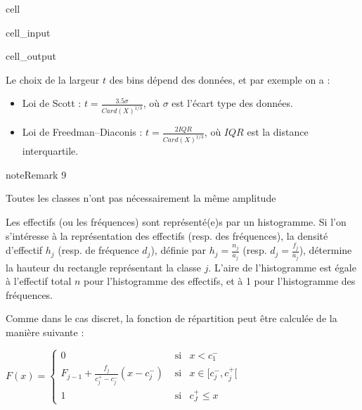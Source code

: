 \documentclass[letterpaper,10pt,english]{jupyterBook}
\begin{document}
\begin{sphinxuseclass}{cell}
\begin{sphinxVerbatimInput}
\begin{sphinxuseclass}{cell_input}
\end{sphinxuseclass}\end{sphinxVerbatimInput}
\begin{sphinxVerbatimOutput}

\begin{sphinxuseclass}{cell_output}
\noindent{}

\end{sphinxuseclass}\end{sphinxVerbatimOutput}

\end{sphinxuseclass}
\sphinxAtStartPar
Le choix de la largeur \(t\) des bins dépend des données, et par exemple on a :
\begin{itemize}
\item {} 
\sphinxAtStartPar
Loi de Scott : \(t = \frac{3.5 \sigma}{Card(X)^{1/3}}\), où \(\sigma\) est l’écart type des données.

\item {} 
\sphinxAtStartPar
Loi de Freedman–Diaconis : \( t = \frac{2 IQR}{Card(X)^{1/3}}\), où \(IQR\) est la distance interquartile.

\end{itemize}
\label{statsdescriptives:remark-3}
\begin{sphinxadmonition}{note}{Remark 9}



\sphinxAtStartPar
Toutes les classes n’ont pas nécessairement la même amplitude
\end{sphinxadmonition}

\sphinxAtStartPar
Les effectifs (ou les fréquences) sont représenté(e)s par un histogramme. Si l’on s’intéresse à la représentation des effectifs (resp. des fréquences), la densité d’effectif \(h_j\) (resp. de fréquence \(d_j\)),  définie par \(h_j=\frac{n_j}{a_j}\) (resp. \(d_j=\frac{f_j}{a_j}\)), détermine la hauteur du rectangle représentant la classe \(j\). L’aire de l’histogramme est égale à l’effectif total \(n\) pour l’histogramme des effectifs, et à 1 pour l’histogramme des fréquences.

\sphinxAtStartPar
Comme dans le cas discret, la fonction de répartition peut être calculée de la manière suivante :

\sphinxAtStartPar
\(F(x) = \left \{
\begin{eqnarray}
0&\textrm{ si}& x<c^-_1\\
F_{j-1}+\frac{f_j}{c^+_j-c^-_j}(x-c^-_j) &\textrm{ si}& x\in[c^-_j,c^+_j[\\
1& \textrm{ si}&c^+_J\leq x
\end{eqnarray}\right .\)
\end{document}
